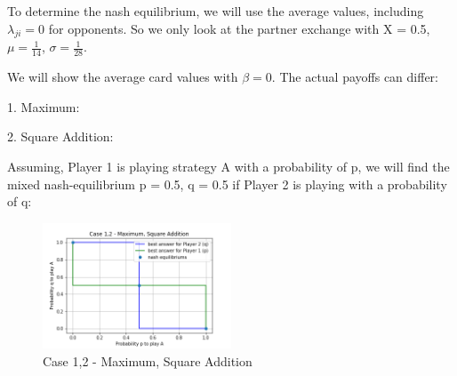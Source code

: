 To determine the nash equilibrium, we will use the average values, including $\lambda_{ji} = 0$ for opponents. So we only look at the partner exchange with X = 0.5, $\mu = \frac{1}{14}$, $\sigma = \frac{1}{28}$.

We will show the average card values with $\beta =0$. The actual payoffs can differ:
\begin{table}[h]
\end{table}

1. Maximum:
\begin{table}[h]
\end{table}

2. Square Addition:
\begin{table}[h]
\end{table}

Assuming, Player 1 is playing strategy A with a probability of p, we will find the mixed nash-equilibrium p = 0.5, q = 0.5 if Player 2 is playing with a probability of q:

\begin{figure}[!ht]
    \centering
    \includegraphics[width=0.5\textwidth]{Bilder/5_max}
    \caption{Case 1,2 - Maximum, Square Addition}
    \label{fig:15}
\end{figure}


